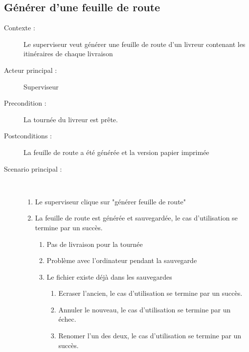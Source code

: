 \subsection{G\'en\'erer d'une feuille de route}
\begin{description}
    \item[Contexte :] Le superviseur veut g\'en\'erer une feuille de route d'un livreur contenant les itin\'eraires de chaque livraison
    \item[Acteur principal :] Superviseur
    \item[Precondition :] La tourn\'ee du livreur est pr\^ete.
    \item[Postconditions :] La feuille de route a \'et\'e g\'en\'er\'ee et la version papier imprim\'ee
    \item[Scenario principal :] ~
    \begin{enumerate}
        \item Le superviseur clique sur "g\'en\'erer feuille de route"
        \item La feuille de route est g\'en\'er\'ee et sauvegard\'ee, le cas d'utilisation se termine par un succ\`es.
        \begin{enumerate}
            \item Pas de livraison pour la tourn\'ee
            \item Probl\`eme avec l'ordinateur pendant la sauvegarde
            \item Le fichier existe d\'ej\`a dans les sauvegardes
            \begin{enumerate}
                \item Ecraser l'ancien, le cas d'utilisation se termine par un succ\`es.
                \item Annuler le nouveau, le cas d'utilisation se termine par un \'echec.
                \item Renomer l'un des deux, le cas d'utilisation se termine par un succ\`es.
            \end{enumerate}
        \end{enumerate}
    \end{enumerate}
\end{description}
\pagebreak

